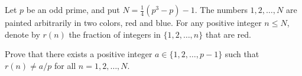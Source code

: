 Let $p$ be an odd prime, and put $N = \frac{1}{4}(p^3 - p) - 1$. The numbers $1, 2, \ldots, N$ are painted arbitrarily in two colors, red and blue. For any positive integer $n \leqslant N$, denote by $r(n)$ the fraction of integers in $\{1, 2, \ldots, n\}$ that are red.

Prove that there exists a positive integer $a \in \{1, 2, \ldots, p-1\}$ such that $r(n) \neq a/p$ for all $n = 1, 2, \ldots, N$.
